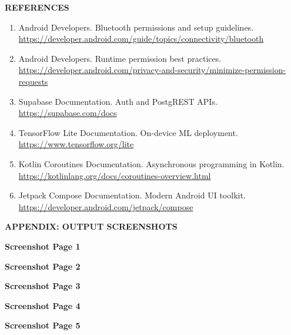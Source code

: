 \documentclass[12pt,a4paper]{report}
\begin{document}
\clearpage
\begin{center}
{\Large \textbf{REFERENCES}}
\end{center}
\begin{enumerate}[leftmargin=1.2cm]
\item Android Developers. Bluetooth permissions and setup guidelines. \url{https://developer.android.com/guide/topics/connectivity/bluetooth}
\item Android Developers. Runtime permission best practices. \url{https://developer.android.com/privacy-and-security/minimize-permission-requests}
\item Supabase Documentation. Auth and PostgREST APIs. \url{https://supabase.com/docs}
\item TensorFlow Lite Documentation. On-device ML deployment. \url{https://www.tensorflow.org/lite}
\item Kotlin Coroutines Documentation. Asynchronous programming in Kotlin. \url{https://kotlinlang.org/docs/coroutines-overview.html}
\item Jetpack Compose Documentation. Modern Android UI toolkit. \url{https://developer.android.com/jetpack/compose}
\end{enumerate}

\clearpage
\appendix
\begin{center}
{\Large \textbf{APPENDIX: OUTPUT SCREENSHOTS}}
\end{center}

\clearpage \thispagestyle{plain} \null \vfill \begin{center}\textbf{Screenshot Page 1}\end{center}\vfill \clearpage
\clearpage \thispagestyle{plain} \null \vfill \begin{center}\textbf{Screenshot Page 2}\end{center}\vfill \clearpage
\clearpage \thispagestyle{plain} \null \vfill \begin{center}\textbf{Screenshot Page 3}\end{center}\vfill \clearpage
\clearpage \thispagestyle{plain} \null \vfill \begin{center}\textbf{Screenshot Page 4}\end{center}\vfill \clearpage
\clearpage \thispagestyle{plain} \null \vfill \begin{center}\textbf{Screenshot Page 5}\end{center}\vfill \clearpage
\end{document}
